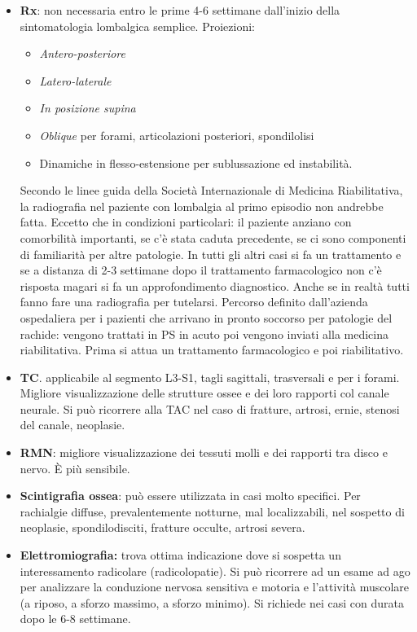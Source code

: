 \begin{itemize}
\item
   
  \textbf{Rx}: non necessaria entro le prime 4-6 settimane dall'inizio
  della sintomatologia lombalgica semplice. Proiezioni:

\begin{itemize}
\item
  \emph{Antero-posteriore}
\item
  \emph{Latero-laterale}
\item
  \emph{In posizione supina}
\item
  \emph{Oblique} per forami, articolazioni posteriori, spondilolisi
\item
  Dinamiche in flesso-estensione per sublussazione ed instabilità.
\end{itemize}

 
Secondo le linee guida della Società Internazionale di Medicina
Riabilitativa, la radiografia nel paziente con lombalgia al primo
episodio non andrebbe fatta. Eccetto che in condizioni particolari: il
paziente anziano con comorbilità importanti, se c'è stata caduta
precedente, se ci sono componenti di familiarità per altre patologie. In
tutti gli altri casi si fa un trattamento e se a distanza di 2-3
settimane dopo il trattamento farmacologico non c'è risposta magari si
fa un approfondimento diagnostico. Anche se in realtà tutti fanno fare
una radiografia per tutelarsi. Percorso definito dall'azienda
ospedaliera per i pazienti che arrivano in pronto soccorso per patologie
del rachide: vengono trattati in PS in acuto poi vengono inviati alla
medicina riabilitativa. Prima si attua un trattamento farmacologico e
poi riabilitativo.
 

\item
   
  \textbf{TC}. applicabile al segmento L3-S1, tagli sagittali,
  trasversali e per i forami. Migliore visualizzazione delle strutture
  ossee e dei loro rapporti col canale neurale. Si può ricorrere alla
  TAC nel caso di fratture, artrosi, ernie, stenosi del canale,
  neoplasie.
   

\item
   
  \textbf{RMN}: migliore visualizzazione dei tessuti molli e dei
  rapporti tra disco e nervo. È più sensibile.

\item
   
  \textbf{Scintigrafia ossea}: può essere utilizzata in casi molto
  specifici. Per rachialgie diffuse, prevalentemente notturne, mal
  localizzabili, nel sospetto di neoplasie, spondilodisciti, fratture
  occulte, artrosi severa.
   

\item
   
  \textbf{Elettromiografia:} trova ottima indicazione dove si sospetta
  un interessamento radicolare (radicolopatie). Si può ricorrere ad un
  esame ad ago per analizzare la conduzione nervosa sensitiva e motoria
  e l'attività muscolare (a riposo, a sforzo massimo, a sforzo minimo).
  Si richiede nei casi con durata dopo le 6-8 settimane.
   
\end{itemize}

